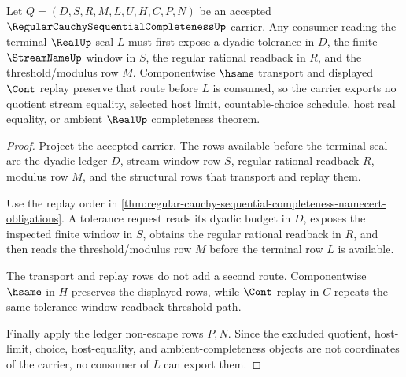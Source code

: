\begin{theorem}
\label{thm:regular-cauchy-sequential-tail-seal}
Let $Q=(D,S,R,M,L,U,H,C,P,N)$ be an accepted $\RegularCauchySequentialCompletenessUp$ carrier. Any consumer reading the terminal $\RealUp$ seal $L$ must first expose a dyadic tolerance in $D$, the finite $\StreamNameUp$ window in $S$, the regular rational readback in $R$, and the threshold/modulus row $M$. Componentwise $\hsame$ transport and displayed $\Cont$ replay preserve that route before $L$ is consumed, so the carrier exports no quotient stream equality, selected host limit, countable-choice schedule, host real equality, or ambient $\RealUp$ completeness theorem.
\end{theorem}
\begin{proof}
Project the accepted carrier. The rows available before the terminal seal are the dyadic ledger $D$, stream-window row $S$, regular rational readback $R$, modulus row $M$, and the structural rows that transport and replay them.

Use the replay order in \autoref{thm:regular-cauchy-sequential-completeness-namecert-obligations}. A tolerance request reads its dyadic budget in $D$, exposes the inspected finite window in $S$, obtains the regular rational readback in $R$, and then reads the threshold/modulus row $M$ before the terminal row $L$ is available.

The transport and replay rows do not add a second route. Componentwise $\hsame$ in $H$ preserves the displayed rows, while $\Cont$ replay in $C$ repeats the same tolerance-window-readback-threshold path.

Finally apply the ledger non-escape rows $P,N$. Since the excluded quotient, host-limit, choice, host-equality, and ambient-completeness objects are not coordinates of the carrier, no consumer of $L$ can export them.
\end{proof}

